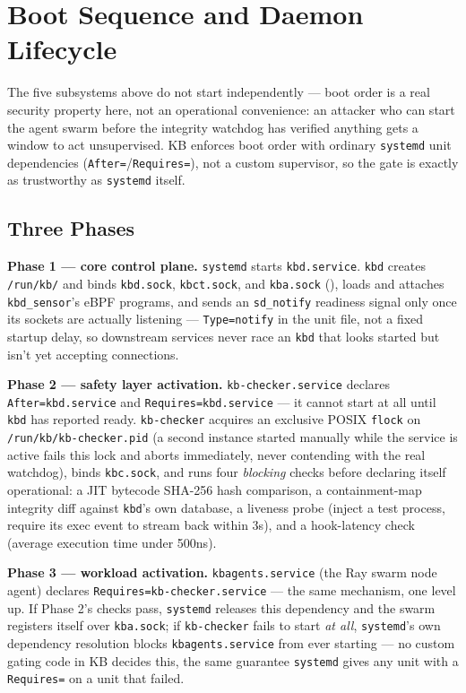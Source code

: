 \documentclass{article}
\begin{document}
\section{Boot Sequence and Daemon Lifecycle}
\label{sec:boot}

The five subsystems above do not start independently --- boot order is
a real security property here, not an operational convenience: an
attacker who can start the agent swarm before the integrity watchdog
has verified anything gets a window to act unsupervised. KB enforces
boot order with ordinary \texttt{systemd} unit dependencies
(\texttt{After=}/\texttt{Requires=}), not a custom supervisor, so the
gate is exactly as trustworthy as \texttt{systemd} itself.

\subsection{Three Phases}

\textbf{Phase 1 --- core control plane.} \texttt{systemd} starts
\texttt{kbd.service}. \texttt{kbd} creates \texttt{/run/kb/} and binds
\texttt{kbd.sock}, \texttt{kbct.sock}, and \texttt{kba.sock}
(), loads and attaches \texttt{kbd\_sensor}'s eBPF
programs, and sends an \texttt{sd\_notify} readiness signal only once
its sockets are actually listening --- \texttt{Type=notify} in the
unit file, not a fixed startup delay, so downstream services never
race an \texttt{kbd} that looks started but isn't yet accepting
connections.

\textbf{Phase 2 --- safety layer activation.} \texttt{kb-checker.service}
declares \texttt{After=kbd.service} and \texttt{Requires=kbd.service}
--- it cannot start at all until \texttt{kbd} has reported ready.
\texttt{kb-checker} acquires an exclusive POSIX \texttt{flock} on
\texttt{/run/kb/kb-checker.pid} (a second instance started manually
while the service is active fails this lock and aborts immediately,
never contending with the real watchdog), binds \texttt{kbc.sock}, and
runs four \emph{blocking} checks before declaring itself operational:
a JIT bytecode SHA-256 hash comparison, a containment-map integrity
diff against \texttt{kbd}'s own database, a liveness probe (inject a
test process, require its exec event to stream back within 3s), and a
hook-latency check (average execution time under 500ns).

\textbf{Phase 3 --- workload activation.} \texttt{kbagents.service}
(the Ray swarm node agent) declares \texttt{Requires=kb-checker.service}
--- the same mechanism, one level up. If Phase 2's checks pass,
\texttt{systemd} releases this dependency and the swarm registers
itself over \texttt{kba.sock}; if \texttt{kb-checker} fails to start
\emph{at all}, \texttt{systemd}'s own dependency resolution blocks
\texttt{kbagents.service} from ever starting --- no custom gating code
in KB decides this, the same guarantee \texttt{systemd} gives any unit
with a \texttt{Requires=} on a unit that failed.
\end{document}
